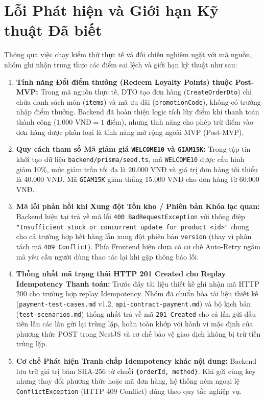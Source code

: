 \documentclass[12pt,a4paper,oneside]{report}
\begin{document}
\section{Lỗi Phát hiện và Giới hạn Kỹ thuật Đã biết}

Thông qua việc chạy kiểm thử thực tế và đối chiếu nghiêm ngặt với mã nguồn, nhóm ghi nhận trung thực các điểm sai lệch và giới hạn kỹ thuật như sau:
\begin{enumerate}
    \item \textbf{Tính năng Đổi điểm thưởng (Redeem Loyalty Points) thuộc Post-MVP:} Trong mã nguồn thực tế, DTO tạo đơn hàng (\texttt{CreateOrderDto}) chỉ chứa danh sách món (\texttt{items}) và mã ưu đãi (\texttt{promotionCode}), không có trường nhập điểm thưởng. Backend đã hoàn thiện logic tích lũy điểm khi thanh toán thành công (\(1.000 \text{ VNĐ} = 1 \text{ điểm}\)), nhưng tính năng cho phép trừ điểm vào đơn hàng được phân loại là tính năng mở rộng ngoài MVP (Post-MVP).
    \item \textbf{Quy cách tham số Mã giảm giá \texttt{WELCOME10} và \texttt{GIAM15K}:} Trong tập tin khởi tạo dữ liệu \texttt{backend/prisma/seed.ts}, mã \texttt{WELCOME10} được cấu hình giảm 10\%, mức giảm trần tối đa là 20.000 VNĐ và giá trị đơn hàng tối thiểu là 40.000 VNĐ. Mã \texttt{GIAM15K} giảm thẳng 15.000 VNĐ cho đơn hàng từ 60.000 VNĐ.
    \item \textbf{Mã lỗi phản hồi khi Xung đột Tồn kho / Phiên bản Khóa lạc quan:} Backend hiện tại trả về mã lỗi \texttt{400 BadRequestException} với thông điệp \texttt{"Insufficient stock or concurrent update for product <id>"} chung cho cả trường hợp hết hàng lẫn xung đột phiên bản \texttt{version} (thay vì phân tách mã \texttt{409 Conflict}). Phía Frontend hiện chưa có cơ chế Auto-Retry ngầm mà yêu cầu người dùng thao tác lại khi gặp thông báo lỗi.
    \item \textbf{Thống nhất mã trạng thái HTTP 201 Created cho Replay Idempotency Thanh toán:} Trước đây tài liệu thiết kế ghi nhận mã HTTP 200 cho trường hợp replay Idempotency. Nhóm đã chuẩn hóa tài liệu thiết kế (\texttt{payment-test-cases.md} v1.2, \texttt{api-contract-payment.md}) và bộ kịch bản (\texttt{test-scenarios.md}) thống nhất trả về mã \texttt{201 Created} cho cả lần gửi đầu tiên lẫn các lần gửi lại trùng lặp, hoàn toàn khớp với hành vi mặc định của phương thức POST trong NestJS và cơ chế bảo vệ giao dịch không bị trừ tiền trùng lặp.
    \item \textbf{Cơ chế Phát hiện Tranh chấp Idempotency khác nội dung:} Backend lưu trữ giá trị băm SHA-256 từ chuỗi \texttt{\{orderId, method\}}. Khi gửi cùng key nhưng thay đổi phương thức hoặc mã đơn hàng, hệ thống ném ngoại lệ \texttt{ConflictException} (HTTP 409 Conflict) đúng theo quy tắc nghiệp vụ.

\end{enumerate}
\end{document}
